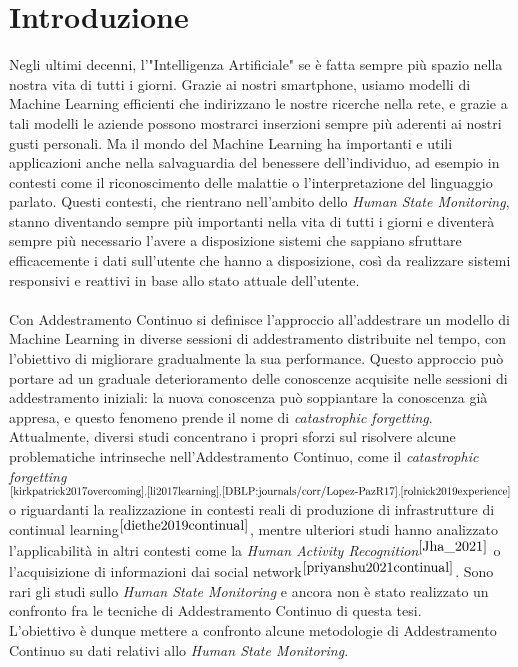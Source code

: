 \chapter*{Introduzione}

Negli ultimi decenni, l'"Intelligenza Artificiale" se è fatta sempre più spazio nella nostra vita di tutti i giorni. Grazie ai nostri smartphone, usiamo modelli di Machine Learning efficienti che indirizzano le nostre ricerche nella rete, e grazie a tali modelli le aziende possono mostrarci inserzioni sempre più aderenti ai nostri gusti personali. Ma il mondo del Machine Learning ha importanti e utili applicazioni anche nella salvaguardia del benessere dell'individuo, ad esempio in contesti come il riconoscimento delle malattie o l'interpretazione del linguaggio parlato. Questi contesti, che rientrano nell'ambito dello \textit{Human State Monitoring}, stanno diventando sempre più importanti nella vita di tutti i giorni e diventerà sempre più necessario l'avere a disposizione sistemi che sappiano sfruttare efficacemente i dati sull'utente che hanno a disposizione, così da realizzare sistemi responsivi e reattivi in base allo stato attuale dell'utente.\\\\
Con Addestramento Continuo si definisce l'approccio all'addestrare un modello di Machine Learning in diverse sessioni di addestramento distribuite nel tempo, con l'obiettivo di migliorare gradualmente la sua performance. Questo approccio può portare ad un graduale deterioramento delle conoscenze acquisite nelle sessioni di addestramento iniziali: la nuova conoscenza può soppiantare la conoscenza già appresa, e questo fenomeno prende il nome di \textit{catastrophic forgetting}. Attualmente, diversi studi concentrano i propri sforzi sul risolvere alcune problematiche intrinseche nell'Addestramento Continuo, come il \textit{catastrophic forgetting}$^{\cite{kirkpatrick2017overcoming},\cite{li2017learning},\cite{DBLP:journals/corr/Lopez-PazR17},\cite{rolnick2019experience}}$ o riguardanti la realizzazione in contesti reali di produzione di infrastrutture di continual learning$^{\cite{diethe2019continual}}$, mentre ulteriori studi hanno analizzato l'applicabilità in altri contesti come la \textit{Human Activity Recognition}$^{\cite{Jha_2021}}$ o l'acquisizione di informazioni dai social network$^{\cite{priyanshu2021continual}}$. Sono rari gli studi sullo \textit{Human State Monitoring} e ancora non è stato realizzato un confronto fra le tecniche di Addestramento Continuo di questa tesi.\\
L'obiettivo è dunque mettere a confronto alcune metodologie di Addestramento Continuo su dati relativi allo \textit{Human State Monitoring}.
